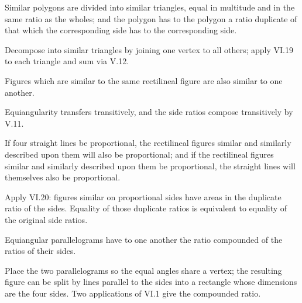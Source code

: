 \begin{claim}
\label{prop:VI.20}
Similar polygons are divided into similar triangles, equal in
multitude and in the same ratio as the wholes; and the polygon has
to the polygon a ratio duplicate of that which the corresponding side
has to the corresponding side.
\end{claim}
\begin{evidence}[Proof of VI.20]
\label{ev:VI.20}
Decompose into similar triangles by joining one vertex to all others;
apply VI.19 to each triangle and sum via V.12.
\end{evidence}

\begin{claim}
\label{prop:VI.21}
Figures which are similar to the same rectilineal figure are also
similar to one another.
\end{claim}
\begin{evidence}[Proof of VI.21]
\label{ev:VI.21}
Equiangularity transfers transitively, and the side ratios compose
transitively by V.11.
\end{evidence}

\begin{claim}
\label{prop:VI.22}
If four straight lines be proportional, the rectilineal figures
similar and similarly described upon them will also be proportional;
and if the rectilineal figures similar and similarly described upon
them be proportional, the straight lines will themselves also be
proportional.
\end{claim}
\begin{evidence}[Proof of VI.22]
\label{ev:VI.22}
Apply VI.20: figures similar on proportional sides have areas in the
duplicate ratio of the sides.  Equality of those duplicate ratios is
equivalent to equality of the original side ratios.
\end{evidence}

\begin{claim}
\label{prop:VI.23}
Equiangular parallelograms have to one another the ratio compounded
of the ratios of their sides.
\end{claim}
\begin{evidence}[Proof of VI.23]
\label{ev:VI.23}
Place the two parallelograms so the equal angles share a vertex; the
resulting figure can be split by lines parallel to the sides into a
rectangle whose dimensions are the four sides.  Two applications of
VI.1 give the compounded ratio.
\end{evidence}

